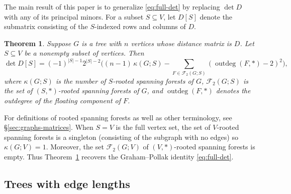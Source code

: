\documentclass[12pt]{amsart}
\newtheorem{mainthm}{Theorem}
\theoremstyle{definition}
\newcommand{\forests}{\mathcal{F}}
\DeclareMathOperator{\outdeg}{outdeg}
\begin{document}
The main result of this paper is to generalize \eqref{eq:full-det} by replacing $\det D$ with any of its principal minors.
For a subset $S \subseteq V$, let $D[S]$ denote the submatrix consisting of the $S$-indexed rows and columns of $D$.
\begin{mainthm}
\label{thm:main}
	Suppose $G$ is a tree with $n$ vertices whose distance matrix is $D$.
	Let $S \subseteq V$ be a nonempty subset of vertices.
	Then
	\begin{equation}\label{eq:main}
		\det D[S] = (-1)^{|S|-1} 2^{|S|-2} \Big( (n-1)\, \kappa(G;S)  - \!\!\! \sum_{F \in \forests_2(G; S)} \left(\outdeg(F,*) - 2\right)^2  \Big),
	\end{equation}
	where 
	$\kappa(G;S)$ is the number of $S$-rooted spanning forests of $G$,
	$\forests_2(G;S)$ is the set of $(S,*)$-rooted spanning forests of $G$,
	and
	$\outdeg(F,*)$ denotes the outdegree of the floating component of $F$.
\end{mainthm}
For definitions of rooted spanning forests as well as other terminology, see \S\ref{sec:graphs-matrices}.
When $S = V$ is the full vertex set, the set of $V$-rooted spanning forests is a singleton (consisting of the subgraph with no edges) so $\kappa(G; V) = 1$. Moreover, the set $\forests_2(G; V)$ of $(V, *)$-rooted spanning forests is empty. 
Thus Theorem~\ref{thm:main} recovers the Graham--Pollak identity \eqref{eq:full-det}.

\subsection{Trees with edge lengths}
\end{document}
